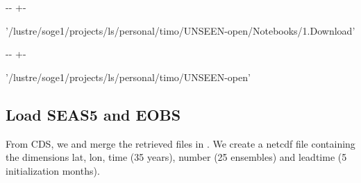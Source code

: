 \documentclass[letterpaper,10pt,english]{sphinxmanual}
\newlength\nbsphinxcodecellspacing
\begin{document}
{

\kern-\sphinxverbatimsmallskipamount\kern-\baselineskip
\kern+\FrameHeightAdjust\kern-\fboxrule
\vspace{\nbsphinxcodecellspacing}

\begin{sphinxVerbatim}[commandchars=\\\{\}]
\llap{\color{nbsphinxout}[3]:\,\hspace{\fboxrule}\hspace{\fboxsep}}'/lustre/soge1/projects/ls/personal/timo/UNSEEN-open/Notebooks/1.Download'
\end{sphinxVerbatim}
}

{

\kern-\sphinxverbatimsmallskipamount\kern-\baselineskip
\kern+\FrameHeightAdjust\kern-\fboxrule
\vspace{\nbsphinxcodecellspacing}

\begin{sphinxVerbatim}[commandchars=\\\{\}]
\llap{\color{nbsphinxout}[3]:\,\hspace{\fboxrule}\hspace{\fboxsep}}'/lustre/soge1/projects/ls/personal/timo/UNSEEN-open'
\end{sphinxVerbatim}
}


\subsection{Load SEAS5 and EOBS}
\label{\detokenize{Notebooks/2.Preprocess/2.3Upscale:Load-SEAS5-and-EOBS}}
From CDS, we  and merge the retrieved files in . We create a netcdf file containing the dimensions lat, lon, time (35 years), number (25 ensembles) and leadtime (5 initialization months).

{
\begin{sphinxVerbatim}[commandchars=\\\{\}]
\llap{\color{nbsphinxin}[4]:\,\hspace{\fboxrule}\hspace{\fboxsep}}  
\end{sphinxVerbatim}
}
\end{document}
